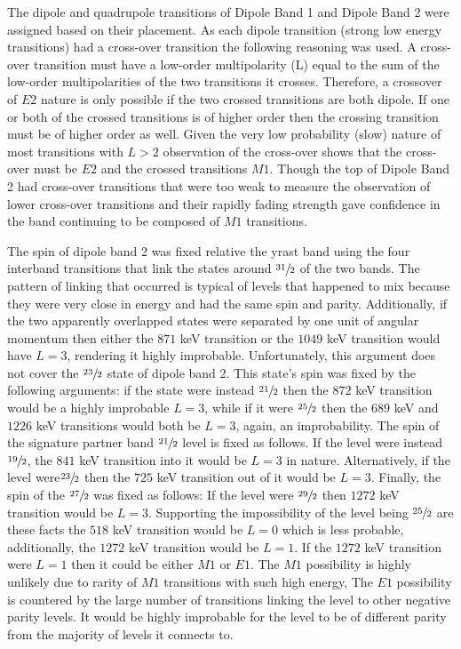 The dipole and quadrupole transitions of Dipole Band 1 and Dipole Band 2 were assigned based on their placement. As each dipole transition (strong low energy transitions) had a cross-over transition the following reasoning was used. A cross-over transition must have a low-order multipolarity (L) equal to the sum of the low-order multipolarities of the two transitions it crosses. Therefore, a crossover of $E2$ nature is only possible if the two crossed transitions are both dipole. If one or both of the crossed transitions is of higher order then the crossing transition must be of higher order as well. Given the very low probability (slow) nature of most transitions with $L>2$ observation of the cross-over shows that the cross-over must be $E2$ and the crossed transitions $M1$. Though the top of Dipole Band 2 had cross-over transitions that were too weak to measure the observation of lower cross-over transitions and their rapidly fading strength gave confidence in the band continuing to be composed of $M1$ transitions.

The spin of dipole band 2 was fixed relative the yrast band using the four interband transitions that link the states around $\sfrac{31}{2}$ of the two bands. The pattern of linking that occurred is typical of levels that happened to mix because they were very close in energy and had the same spin and parity. Additionally, if the two apparently overlapped states were separated by one unit of angular momentum then either the $871$ keV transition or the $1049$ keV transition would have $L=3$, rendering it highly improbable. Unfortunately, this argument does not cover the $\sfrac{23}{2}$ state of dipole band 2. This state's spin was fixed by the following arguments: if the state were instead $\sfrac{21}{2}$ then the $872$ keV transition would be a highly improbable $L=3$, while if it were $\sfrac{25}{2}$ then the $689$ keV and $1226$ keV transitions would both be $L=3$, again, an improbability. The spin of the signature partner band $\sfrac{21}{2}$ level is fixed as follows. If the level were instead $\sfrac{19}{2}$, the $841$ keV transition into it would be $L=3$ in nature. Alternatively, if the level were$\sfrac{23}{2}$ then the $725$ keV transition out of it would be $L=3$. Finally, the spin of the $\sfrac{27}{2}$ was fixed as follows: If the level were $\sfrac{29}{2}$ then $1272$ keV transition would be $L=3$. Supporting the impossibility of the level being $\sfrac{25}{2}$ are these facts the $518$ keV transition would be $L=0$ which is less probable, additionally, the $1272$ keV transition would be $L=1$. If the $1272$ keV transition were $L=1$ then it could be either $M1$ or $E1$. The $M1$ possibility is highly unlikely due to rarity of $M1$ transitions with such high energy, The $E1$ possibility is countered by the large number of transitions linking the level to other negative parity levels. It would be highly improbable for the level to be of different parity from the majority of levels it connects to.

